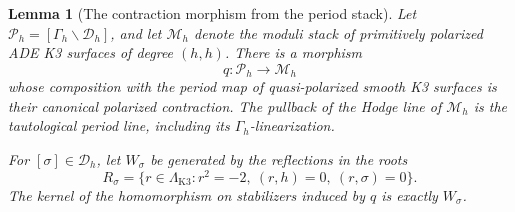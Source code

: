 \documentclass[11pt]{amsart}
\newtheorem{lemma}[theorem]{Lemma}
\theoremstyle{definition}
\theoremstyle{remark}
\numberwithin{equation}{section}
\begin{document}
\begin{lemma}[The contraction morphism from the period stack]
\label{pencil:periodstack}
Let \(\mathscr P_h=[\Gamma_h\backslash\mathscr D_h]\), and let
\(\mathscr M_h\) denote the moduli stack of primitively polarized ADE K3
surfaces of degree \((h,h)\).  There is a morphism
\[
 q:\mathscr P_h\longrightarrow\mathscr M_h
\]
whose composition with the period map of quasi-polarized smooth K3
surfaces is their canonical polarized contraction.  The pullback of
the Hodge line of \(\mathscr M_h\) is the tautological period line,
including its \(\Gamma_h\)-linearization.

For \([\sigma]\in\mathscr D_h\), let \(W_\sigma\) be generated by the
reflections in the roots
\[
 R_\sigma=\{r\in\Lambda_{\mathrm{K3}}:r^2=-2,\ (r,h)=0,\ (r,\sigma)=0\}.
\]
The kernel of the homomorphism on stabilizers induced by \(q\) is exactly
\(W_\sigma\).
\end{lemma}
\end{document}
